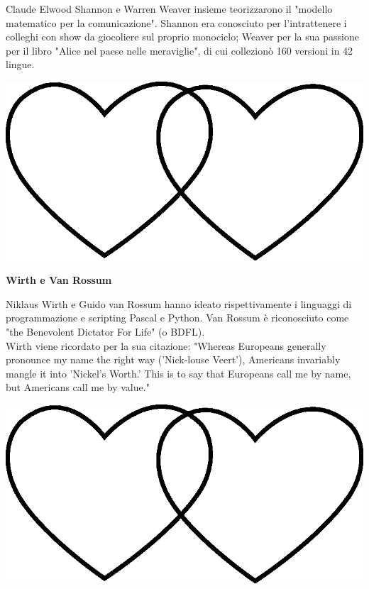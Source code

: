 \documentclass[11pt]{extarticle}
\begin{document}
\begin{center}
Claude Elwood Shannon e Warren Weaver insieme teorizzarono il "modello matematico per la comunicazione". Shannon era conosciuto per l'intrattenere i colleghi con show da giocoliere sul proprio monociclo; Weaver per la sua passione per il libro "Alice nel paese nelle meraviglie", di cui collezionò 160 versioni in 42 lingue.\\
\begin{center}
\includegraphics[scale=0.1]{img/cuori_venn.eps}\\
\end{center}
\end{center}
\vspace*{\fill}
\newpage
\begin{center}
\vspace*{\fill}
{\Huge \textbf{Wirth e Van Rossum\\}}
\vspace*{\fill}
\end{center}
\newpage
{}
\vspace*{\fill}
\begin{center}
Niklaus Wirth e Guido van Rossum hanno ideato rispettivamente i linguaggi di programmazione e scripting Pascal e Python. Van Rossum è riconosciuto come "the Benevolent Dictator For Life" (o BDFL). \\Wirth viene ricordato per la sua citazione: "Whereas Europeans generally pronounce my name the right way ('Nick-louse Veert'), Americans invariably mangle it into 'Nickel's Worth.' This is to say that Europeans call me by name, but Americans call me by value."\\
\begin{center}
\includegraphics[scale=0.1]{img/cuori_venn.eps}\\
\end{center}
\end{center}
\vspace*{\fill}
\newpage
\end{document}
